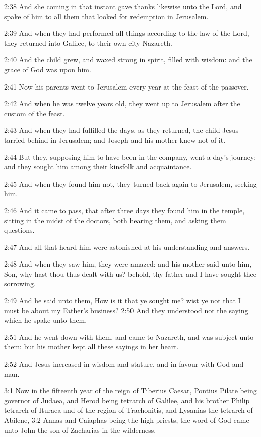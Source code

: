 2:38 And she coming in that instant gave thanks likewise unto the Lord, and spake of him to all them that looked for redemption in Jerusalem.

2:39 And when they had performed all things according to the law of the Lord, they returned into Galilee, to their own city Nazareth.

2:40 And the child grew, and waxed strong in spirit, filled with wisdom: and the grace of God was upon him.

2:41 Now his parents went to Jerusalem every year at the feast of the passover.

2:42 And when he was twelve years old, they went up to Jerusalem after the custom of the feast.

2:43 And when they had fulfilled the days, as they returned, the child Jesus tarried behind in Jerusalem; and Joseph and his mother knew not of it.

2:44 But they, supposing him to have been in the company, went a day's journey; and they sought him among their kinsfolk and acquaintance.

2:45 And when they found him not, they turned back again to Jerusalem, seeking him.

2:46 And it came to pass, that after three days they found him in the temple, sitting in the midst of the doctors, both hearing them, and asking them questions.

2:47 And all that heard him were astonished at his understanding and answers.

2:48 And when they saw him, they were amazed: and his mother said unto him, Son, why hast thou thus dealt with us? behold, thy father and I have sought thee sorrowing.

2:49 And he said unto them, How is it that ye sought me? wist ye not that I must be about my Father's business?  2:50 And they understood not the saying which he spake unto them.

2:51 And he went down with them, and came to Nazareth, and was subject unto them: but his mother kept all these sayings in her heart.

2:52 And Jesus increased in wisdom and stature, and in favour with God and man.

3:1 Now in the fifteenth year of the reign of Tiberius Caesar, Pontius Pilate being governor of Judaea, and Herod being tetrarch of Galilee, and his brother Philip tetrarch of Ituraea and of the region of Trachonitis, and Lysanias the tetrarch of Abilene, 3:2 Annas and Caiaphas being the high priests, the word of God came unto John the son of Zacharias in the wilderness.

